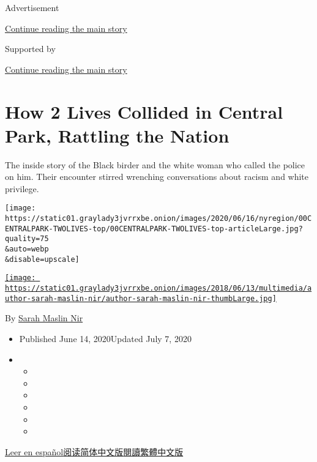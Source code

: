 Advertisement

\protect\hyperlink{after-top}{Continue reading the main story}

Supported by

\protect\hyperlink{after-sponsor}{Continue reading the main story}

\hypertarget{how-2-lives-collided-in-central-park-rattling-the-nation}{%
\section{How 2 Lives Collided in Central Park, Rattling the
Nation}\label{how-2-lives-collided-in-central-park-rattling-the-nation}}

The inside story of the Black birder and the white woman who called the
police on him. Their encounter stirred wrenching conversations about
racism and white privilege.

\texttt{[image: https://static01.graylady3jvrrxbe.onion/images/2020/06/16/nyregion/00CENTRALPARK-TWOLIVES-top/00CENTRALPARK-TWOLIVES-top-articleLarge.jpg?quality=75\\\&auto=webp\\\&disable=upscale]}

\href{https://www.nytimes3xbfgragh.onion/by/sarah-maslin-nir}{\texttt{[image: https://static01.graylady3jvrrxbe.onion/images/2018/06/13/multimedia/author-sarah-maslin-nir/author-sarah-maslin-nir-thumbLarge.jpg]}}

By \href{https://www.nytimes3xbfgragh.onion/by/sarah-maslin-nir}{Sarah
Maslin Nir}

\begin{itemize}
\item
  Published June 14, 2020Updated July 7, 2020
\item
  \begin{itemize}
  \item
  \item
  \item
  \item
  \item
  \item
  \end{itemize}
\end{itemize}

\href{https://www.nytimes3xbfgragh.onion/es/2020/06/15/espanol/central-park-racismo-amy-cooper.html}{Leer
en
español}\href{https://cn.nytimes3xbfgragh.onion/usa/20200617/central-park-amy-cooper-christian-racism/}{阅读简体中文版}\href{https://cn.nytimes3xbfgragh.onion/usa/20200617/central-park-amy-cooper-christian-racism/zh-h}{閱讀繁體中文版}

